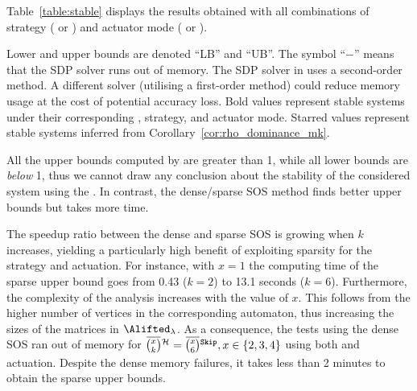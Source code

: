Table~\ref{table:stable} displays the results obtained with all combinations of strategy (\tK{} or \tS{}) and actuator mode (\tZ{} or \tH{}).

Lower and upper bounds are denoted ``LB'' and ``UB''. 
The symbol ``$-$'' means that the SDP solver runs out of memory.
The SDP solver in  uses a second-order method.
A different solver (utilising a first-order method) could reduce memory usage at the cost of potential accuracy loss.
Bold values represent stable systems under their corresponding \ewhc{}, strategy, and actuator mode.
Starred values represent stable systems inferred from Corollary~\ref{cor:rho_dominance_mk}.

All the upper bounds computed by  are greater than 1, while all lower bounds are \emph{below} 1, thus we cannot draw any conclusion about the stability of the considered system using the .
In contrast, the dense/sparse SOS method finds better upper bounds but takes more time.

The speedup ratio between the dense and sparse SOS is growing when $k$ increases, yielding a particularly high benefit of exploiting sparsity for the \tS{} strategy and \tZ{} actuation.
For instance, with $x=1$ the computing time of the sparse upper bound goes from 0.43 ($k=2$) to 13.1 seconds ($k=6$).
%
Furthermore, the complexity of the analysis increases with the value of $x$.
This follows from the higher number of vertices in the corresponding automaton, thus increasing the sizes of the matrices in $\Alifted_{\lambda}$. 
%
As a consequence, the tests using the dense SOS ran out of memory for $\eanymiss{}{\strat} = \overbar{\binom{x}{6}}^{\text{\tS{}}}, x \in \left\{ 2, 3, 4 \right\}$ using both \tH{} and \tZ{} actuation.
Despite the dense memory failures, it takes less than 2 minutes to obtain the sparse upper bounds.


